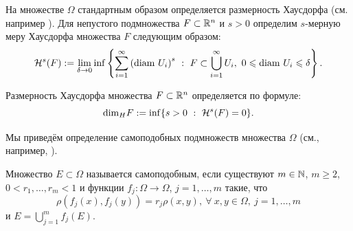 На множестве $\Omega$ стандартным образом определяется размерность Хаусдорфа (см. например \cite[Секция 6]{Edgar}).
Для непустого подмножества $F\subset \mathbb{R}^n$ и $s > 0$ определим $s$-мерную меру Хаусдорфа множества $F$ следующим образом:
$$\mathcal H^s(F) := \lim_{\delta\to0} \inf \left\{\sum_{i=1}^\infty \left({\rm diam} \ U_i \right)^s \ : \ F\subset \bigcup_{i=1}^\infty  U_i, \  0\leqslant {\rm diam} \ U_i \leqslant \delta \right\}.$$

Размерность Хаусдорфа множества  $F\subset \mathbb{R}^n$ определяется по формуле:
$${\rm dim}_H F := \inf\{ s > 0 \ : \ \mathcal H^s(F)=0\}.$$



Мы приведём определение самоподобных подмножеств множества $\Omega$ (см., например, \cite{falconer2003fractal}).

\begin{definition}
Множество $E\subset\Omega$ называется самоподобным, если существуют $m\in\mathbb{N}$,
$m\geqslant2$, $0< r_1, \dots, r_m<1$ и функции $f_j : \Omega \to \Omega$, $j=1,\dots, m$ такие, что
$$\rho(f_j(x), f_j(y)) = r_j \rho(x,y), \ \forall \ x,y \in \Omega, \ j=1,\dots, m$$
и $E=\bigcup_{j=1}^m f_j(E).$
\end{definition}

